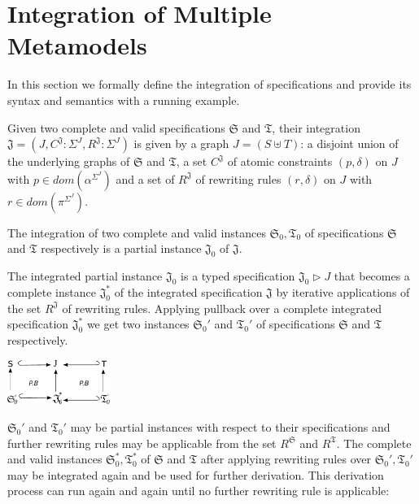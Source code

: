 \documentclass{eceasst}
\begin{document}
\section{Integration of Multiple Metamodels}
In this section we formally define the integration of specifications and provide its syntax and semantics with a running example. 

\begin{definition}
 Given two complete and valid specifications $\mathfrak{S}$ and $\mathfrak{T}$, their integration $\mathfrak{J} = (J, C^{\mathfrak{J}}: \Sigma^J, R^{\mathfrak{J}}:\Sigma^J)$ is given 
 by a graph $J = (S \uplus T)$: a disjoint union of the underlying graphs of $\mathfrak{S}$ and $\mathfrak{T}$, 
 a set $C^{\mathfrak{J}}$ of atomic constraints $(p, \delta)$ on $J$ with $p \in dom(\alpha^{\Sigma^J})$ and 
 a set of $R^{\mathfrak{J}}$ of rewriting rules $(r,\delta)$ on $J$ with $r \in dom(\pi^{\Sigma^J})$.
\end{definition}

\begin{proposition}
 The integration of two complete and valid instances $\mathfrak{S}_0, \mathfrak{T}_0$ of specifications $\mathfrak{S}$ and $\mathfrak{T}$ respectively is a partial instance 
 $\mathfrak{J}_0$ of $\mathfrak{J}$.  
\end{proposition}

The integrated partial instance $\mathfrak{J}_0$ is a typed specification $\mathfrak{J}_0 \rhd J$ that becomes a complete instance $\mathfrak{J}_0^*$ of the integrated specification 
$\mathfrak{J}$ by iterative applications of the set $R^{\mathfrak{J}}$ of rewriting rules. 
Applying pullback over a complete integrated specification $\mathfrak{J}_0^*$ we get two instances $\mathfrak{S}_0'$ and $\mathfrak{T}_0'$ of 
specifications $\mathfrak{S}$ and $\mathfrak{T}$ respectively.

\begin{center}
\includegraphics[width=0.25\textwidth]{intr-pb.pdf}
\end{center}

\noindent
$\mathfrak{S}_0'$ and $\mathfrak{T}_0'$ may be partial instances with respect to their specifications and further rewriting rules may be applicable 
from the set $R^{\mathfrak{S}}$ and $R^{\mathfrak{T}}$. The complete and valid instances $\mathfrak{S}_0^*, \mathfrak{T}_0^*$ of $\mathfrak{S}$ and $\mathfrak{T}$ after applying rewriting rules over 
$\mathfrak{S}_0', \mathfrak{T}_0'$ may be integrated again and be used for further derivation. This derivation process can run again and again until no further rewriting rule is applicable: 
\end{document}
